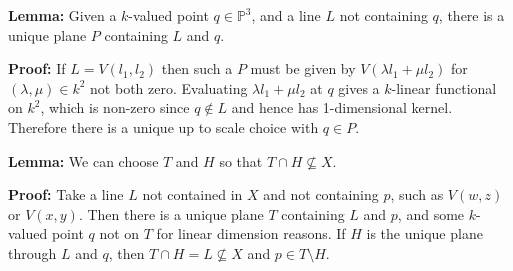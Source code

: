 \documentclass{report}
\renewcommand{\P}{\mathbb{P}} %
\begin{document}
\begin{enumerate}[label=\textbf{8.2.\Alph*.}]
\begin{enumerate}[label=(\alph*)]
		            \textbf{Lemma:} Given a $k$-valued point $q\in\P^3$, and a line
		            $L$ not containing $q$, there is a unique plane $P$ containing
		            $L$ and $q$.

		            \textbf{Proof:} If $L=V(l_1,l_2)$ then such a $P$ must be given
		            by $V(\lambda l_1+\mu l_2)$ for $(\lambda,\mu)\in k^2$ not both
		            zero. Evaluating $\lambda l_1+\mu l_2$ at $q$ gives a $k$-linear
		            functional on $k^2$, which is non-zero since $q\notin L$ and
		            hence has 1-dimensional kernel. Therefore there is a unique up
		            to scale choice with $q\in P$.

		            \textbf{Lemma:} We can choose $T$ and $H$ so that
		            $T\cap H\not\subseteq X$.

		            \textbf{Proof:} Take a line $L$ not contained in $X$ and not
		            containing $p$, such as $V(w,z)$ or $V(x,y)$. Then there is a
		            unique plane $T$ containing $L$ and $p$, and some $k$-valued
		            point $q$ not on $T$ for linear dimension reasons. If $H$ is the
		            unique plane through $L$ and $q$, then
		            $T\cap H=L\not\subseteq X$ and $p\in T\setminus H$.
	      \end{enumerate}
\end{enumerate}
\end{document}
